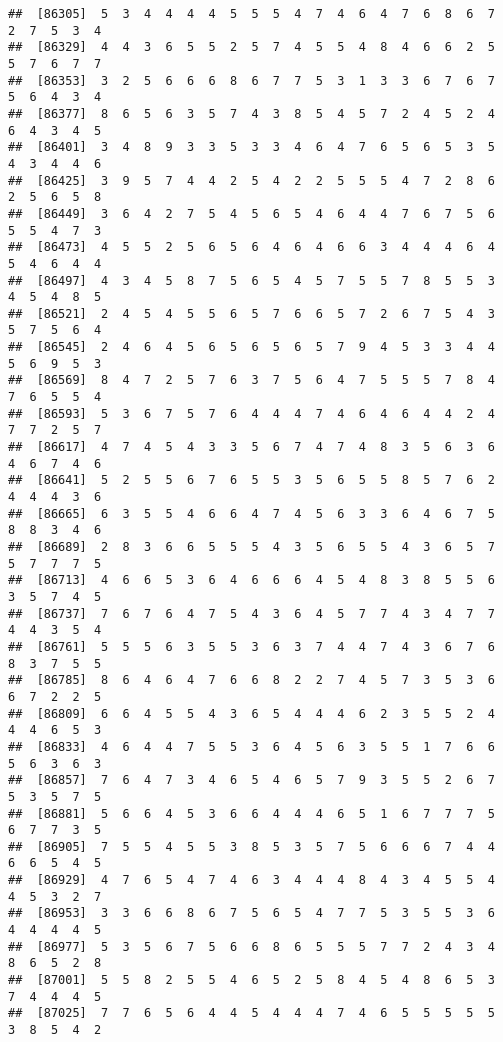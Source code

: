 \documentclass[
]{book}
\begin{document}
\begin{verbatim}
##  [86305]  5  3  4  4  4  4  5  5  5  4  7  4  6  4  7  6  8  6  7  2  7  5  3  4
##  [86329]  4  4  3  6  5  5  2  5  7  4  5  5  4  8  4  6  6  2  5  5  7  6  7  7
##  [86353]  3  2  5  6  6  6  8  6  7  7  5  3  1  3  3  6  7  6  7  5  6  4  3  4
##  [86377]  8  6  5  6  3  5  7  4  3  8  5  4  5  7  2  4  5  2  4  6  4  3  4  5
##  [86401]  3  4  8  9  3  3  5  3  3  4  6  4  7  6  5  6  5  3  5  4  3  4  4  6
##  [86425]  3  9  5  7  4  4  2  5  4  2  2  5  5  5  4  7  2  8  6  2  5  6  5  8
##  [86449]  3  6  4  2  7  5  4  5  6  5  4  6  4  4  7  6  7  5  6  5  5  4  7  3
##  [86473]  4  5  5  2  5  6  5  6  4  6  4  6  6  3  4  4  4  6  4  5  4  6  4  4
##  [86497]  4  3  4  5  8  7  5  6  5  4  5  7  5  5  7  8  5  5  3  4  5  4  8  5
##  [86521]  2  4  5  4  5  5  6  5  7  6  6  5  7  2  6  7  5  4  3  5  7  5  6  4
##  [86545]  2  4  6  4  5  6  5  6  5  6  5  7  9  4  5  3  3  4  4  5  6  9  5  3
##  [86569]  8  4  7  2  5  7  6  3  7  5  6  4  7  5  5  5  7  8  4  7  6  5  5  4
##  [86593]  5  3  6  7  5  7  6  4  4  4  7  4  6  4  6  4  4  2  4  7  7  2  5  7
##  [86617]  4  7  4  5  4  3  3  5  6  7  4  7  4  8  3  5  6  3  6  4  6  7  4  6
##  [86641]  5  2  5  5  6  7  6  5  5  3  5  6  5  5  8  5  7  6  2  4  4  4  3  6
##  [86665]  6  3  5  5  4  6  6  4  7  4  5  6  3  3  6  4  6  7  5  8  8  3  4  6
##  [86689]  2  8  3  6  6  5  5  5  4  3  5  6  5  5  4  3  6  5  7  5  7  7  7  5
##  [86713]  4  6  6  5  3  6  4  6  6  6  4  5  4  8  3  8  5  5  6  3  5  7  4  5
##  [86737]  7  6  7  6  4  7  5  4  3  6  4  5  7  7  4  3  4  7  7  4  4  3  5  4
##  [86761]  5  5  5  6  3  5  5  3  6  3  7  4  4  7  4  3  6  7  6  8  3  7  5  5
##  [86785]  8  6  4  6  4  7  6  6  8  2  2  7  4  5  7  3  5  3  6  6  7  2  2  5
##  [86809]  6  6  4  5  5  4  3  6  5  4  4  4  6  2  3  5  5  2  4  4  4  6  5  3
##  [86833]  4  6  4  4  7  5  5  3  6  4  5  6  3  5  5  1  7  6  6  5  6  3  6  3
##  [86857]  7  6  4  7  3  4  6  5  4  6  5  7  9  3  5  5  2  6  7  5  3  5  7  5
##  [86881]  5  6  6  4  5  3  6  6  4  4  4  6  5  1  6  7  7  7  5  6  7  7  3  5
##  [86905]  7  5  5  4  5  5  3  8  5  3  5  7  5  6  6  6  7  4  4  6  6  5  4  5
##  [86929]  4  7  6  5  4  7  4  6  3  4  4  4  8  4  3  4  5  5  4  4  5  3  2  7
##  [86953]  3  3  6  6  8  6  7  5  6  5  4  7  7  5  3  5  5  3  6  4  4  4  4  5
##  [86977]  5  3  5  6  7  5  6  6  8  6  5  5  5  7  7  2  4  3  4  8  6  5  2  8
##  [87001]  5  5  8  2  5  5  4  6  5  2  5  8  4  5  4  8  6  5  3  7  4  4  4  5
##  [87025]  7  7  6  5  6  4  4  5  4  4  4  7  4  6  5  5  5  5  5  3  8  5  4  2

\end{verbatim}
\end{document}
